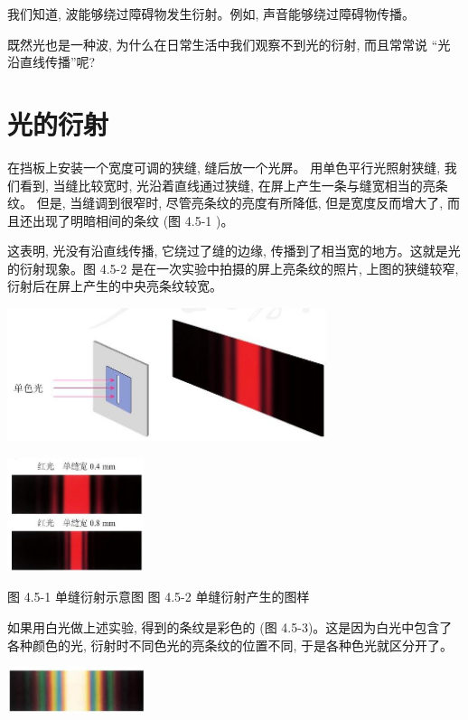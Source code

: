 \documentclass[10pt]{article}
\begin{document}
我们知道, 波能够绕过障碍物发生衍射。例如, 声音能够绕过障碍物传播。

既然光也是一种波, 为什么在日常生活中我们观察不到光的衍射, 而且常常说 “光沿直线传播”呢?

\section*{光的衍射}

在挡板上安装一个宽度可调的狭缝, 缝后放一个光屏。 用单色平行光照射狭缝, 我们看到, 当缝比较宽时, 光沿着直线通过狭缝, 在屏上产生一条与缝宽相当的亮条纹。 但是, 当缝调到很窄时, 尽管亮条纹的亮度有所降低, 但是宽度反而增大了, 而且还出现了明暗相间的条纹 (图 4.5-1 )。

这表明, 光没有沿直线传播, 它绕过了缝的边缘, 传播到了相当宽的地方。这就是光的衍射现象。图 4.5-2 是在一次实验中拍摄的屏上亮条纹的照片, 上图的狭缝较窄, 衍射后在屏上产生的中央亮条纹较宽。

\begin{center}
\includegraphics[max width=0.7\textwidth]{images/01910e4c-ebb8-7d2c-8f2f-2375bc1d2d12_109_468213.jpg}
\end{center}

\begin{center}
\includegraphics[max width=0.3\textwidth]{images/01910e4c-ebb8-7d2c-8f2f-2375bc1d2d12_109_846335.jpg}
\end{center}

图 4.5-1 单缝衍射示意图 图 4.5-2 单缝衍射产生的图样

如果用白光做上述实验, 得到的条纹是彩色的 (图 4.5-3)。这是因为白光中包含了各种颜色的光, 衍射时不同色光的亮条纹的位置不同, 于是各种色光就区分开了。

\begin{center}
\includegraphics[max width=0.3\textwidth]{images/01910e4c-ebb8-7d2c-8f2f-2375bc1d2d12_110_332656.jpg}
\end{center}
\end{document}
